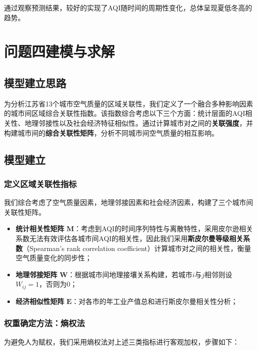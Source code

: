 \documentclass[a4paper,12pt]{article}
\begin{document}
	通过观察预测结果，较好的实现了AQI随时间的周期性变化，总体呈现夏低冬高的趋势。

			
	\section{问题四建模与求解}
	
	\subsection{模型建立思路}
	
	为分析江苏省13个城市空气质量的区域关联性，我们定义了一个融合多种影响因素的城市间区域综合关联性指数。该指数综合考虑以下三个方面：统计层面的AQI相关性、地理邻接性以及社会经济特征相似性。通过计算城市对之间的\textbf{关联强度}，并构建城市间的\textbf{综合关联性矩阵}，分析不同城市间空气质量的相互影响。
	
	\subsection{模型建立}
		\subsubsection{定义区域关联性指标}
	
	我们综合考虑了空气质量因素，地理邻接因素和社会经济因素，构建了三个城市间关联性矩阵。
	
	\begin{itemize}
		\item \textbf{统计相关性矩阵} $\mathbf{M}$：考虑到AQI的时间序列特性与离散特性，采用皮尔逊相关系数无法有效评估各城市间AQI的相关性，因此我们采用\textbf{斯皮尔曼等级相关系数}（Spearman’s rank correlation coefficient）计算城市对之间的相关性，衡量空气质量变化的同步性；
		
		\item \textbf{地理邻接矩阵} $\mathbf{W}$：根据城市间地理接壤关系构建，若城市$i$与$j$相邻则设$W_{ij}=1$，否则为0；
		
		\item \textbf{经济相似性矩阵} $\mathbf{E}$：对各市的年工业产值总和进行斯皮尔曼相关性分析；
	\end{itemize}
	
	\subsubsection{权重确定方法：熵权法}
	
	为避免人为赋权，我们采用熵权法对上述三类指标进行客观加权，步骤如下：
	
\end{document}
